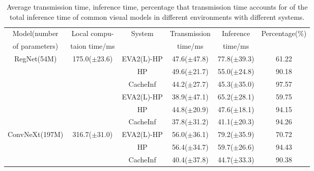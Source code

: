 \begin{table}[h!]

    \renewcommand\arraystretch{0.95}
    \centering
\begin{tabular}{ccc|c|c|c}
\toprule
 Model(number&  Local compu- & \multirow[c]{2}{*}{System} & \multicolumn{1}{|c|}{Transmission } & \multicolumn{1}{|c|}{Inference } & \multirow[c]{2}{*}{Percentage(\%)} \\
 of parameters) & taion time/ms &  & time/ms & time/ms & \\
\midrule
\multirow[c]{4}{*}{RegNet(54M)} & \multirow[c]{4}{*}{175.0($\pm$23.6)} & EVA2(L)-HP & 47.6($\pm$47.8) & 77.8($\pm$39.3) & 61.22  \\
 &  & HP & 49.6($\pm$21.7) & 55.0($\pm$24.8) & 90.18  \\
 &  & CacheInf & 44.2($\pm$27.7) & 45.3($\pm$35.0) & 97.57  \\
\cline{1-6}
\multirow[c]{4}{*}{VGG19(143M)} & \multirow[c]{4}{*}{118.0($\pm$18.9)} & EVA2(L)-HP & 38.9($\pm$47.1) & 65.2($\pm$28.1) & 59.75  \\
 &  & HP & 44.8($\pm$20.9) & 47.6($\pm$18.1) & 94.15  \\
 &  & CacheInf & 37.8($\pm$31.2) & 41.1($\pm$20.3) & 94.26  \\
\cline{1-6}
\multirow[c]{4}{*}{ConvNeXt(197M)} & \multirow[c]{4}{*}{316.7($\pm$31.0)} & EVA2(L)-HP & 56.0($\pm$36.1) & 79.2($\pm$35.9) & 70.72  \\
 &  & HP & 56.4($\pm$34.7) & 59.7($\pm$26.6) & 94.43  \\
 &  & CacheInf & 40.4($\pm$37.8) & 44.7($\pm$33.3) & 90.38  \\
\cline{1-6}
\bottomrule
\end{tabular}
    \caption{Average transmission time, inference time, percentage that transmission time accounts for of the total inference time of common visual models in different environments with different systems. }
    \label{tab:torchvision_time}
\end{table}

